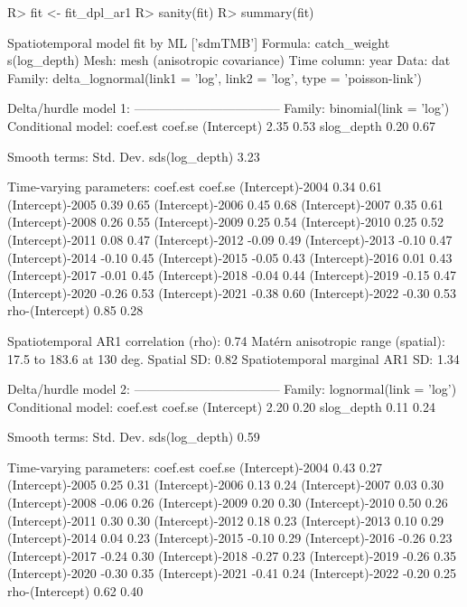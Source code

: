 \documentclass[article]{jss}\usepackage[]{graphicx}\usepackage[dvipsnames]{xcolor}
\begin{document}
\begin{Schunk}
\begin{Sinput}
R> fit <- fit_dpl_ar1
R> sanity(fit)
R> summary(fit)
\end{Sinput}
\begin{Soutput}
Spatiotemporal model fit by ML ['sdmTMB']
Formula: catch_weight ~ s(log_depth)
Mesh: mesh (anisotropic covariance)
Time column: year
Data: dat
Family: delta_lognormal(link1 = 'log', link2 = 'log', type = 'poisson-link')

Delta/hurdle model 1: -----------------------------------
Family: binomial(link = 'log')
Conditional model:
            coef.est coef.se
(Intercept)     2.35    0.53
slog_depth      0.20    0.67

Smooth terms:
               Std. Dev.
sds(log_depth)      3.23

Time-varying parameters:
                 coef.est coef.se
(Intercept)-2004     0.34    0.61
(Intercept)-2005     0.39    0.65
(Intercept)-2006     0.45    0.68
(Intercept)-2007     0.35    0.61
(Intercept)-2008     0.26    0.55
(Intercept)-2009     0.25    0.54
(Intercept)-2010     0.25    0.52
(Intercept)-2011     0.08    0.47
(Intercept)-2012    -0.09    0.49
(Intercept)-2013    -0.10    0.47
(Intercept)-2014    -0.10    0.45
(Intercept)-2015    -0.05    0.43
(Intercept)-2016     0.01    0.43
(Intercept)-2017    -0.01    0.45
(Intercept)-2018    -0.04    0.44
(Intercept)-2019    -0.15    0.47
(Intercept)-2020    -0.26    0.53
(Intercept)-2021    -0.38    0.60
(Intercept)-2022    -0.30    0.53
rho-(Intercept)      0.85    0.28

Spatiotemporal AR1 correlation (rho): 0.74
Matérn anisotropic range (spatial): 17.5 to 183.6 at 130 deg.
Spatial SD: 0.82
Spatiotemporal marginal AR1 SD: 1.34

Delta/hurdle model 2: -----------------------------------
Family: lognormal(link = 'log')
Conditional model:
            coef.est coef.se
(Intercept)     2.20    0.20
slog_depth      0.11    0.24

Smooth terms:
               Std. Dev.
sds(log_depth)      0.59

Time-varying parameters:
                 coef.est coef.se
(Intercept)-2004     0.43    0.27
(Intercept)-2005     0.25    0.31
(Intercept)-2006     0.13    0.24
(Intercept)-2007     0.03    0.30
(Intercept)-2008    -0.06    0.26
(Intercept)-2009     0.20    0.30
(Intercept)-2010     0.50    0.26
(Intercept)-2011     0.30    0.30
(Intercept)-2012     0.18    0.23
(Intercept)-2013     0.10    0.29
(Intercept)-2014     0.04    0.23
(Intercept)-2015    -0.10    0.29
(Intercept)-2016    -0.26    0.23
(Intercept)-2017    -0.24    0.30
(Intercept)-2018    -0.27    0.23
(Intercept)-2019    -0.26    0.35
(Intercept)-2020    -0.30    0.35
(Intercept)-2021    -0.41    0.24
(Intercept)-2022    -0.20    0.25
rho-(Intercept)      0.62    0.40


\end{Soutput}
\end{Schunk}
\end{document}
